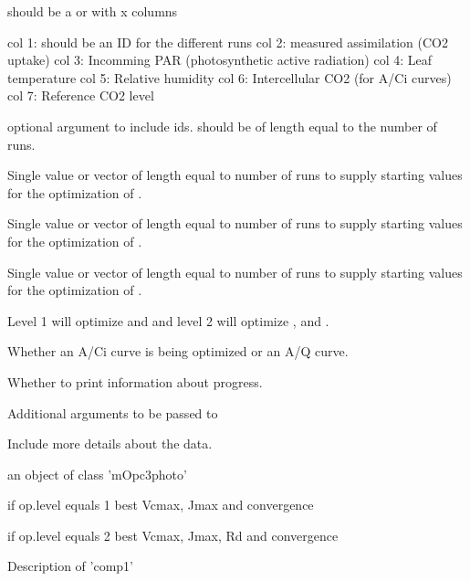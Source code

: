 \documentclass[letterpaper]{book}
\begin{document}
\begin{Arguments}
\begin{ldescription}
\item[\code{data}] should be a  or
 with x columns

col 1: should be an ID for the different runs col 2:
measured assimilation (CO2 uptake) col 3: Incomming PAR
(photosynthetic active radiation) col 4: Leaf temperature
col 5: Relative humidity col 6: Intercellular CO2 (for
A/Ci curves) col 7: Reference CO2 level

\item[\code{ID}] optional argument to include ids. should be of
length equal to the number of runs.

\item[\code{iVcmax}] Single value or vector of length equal to
number of runs to supply starting values for the
optimization of .

\item[\code{iJmax}] Single value or vector of length equal to
number of runs to supply starting values for the
optimization of .

\item[\code{iRd}] Single value or vector of length equal to
number of runs to supply starting values for the
optimization of .

\item[\code{op.level}] Level 1 will optimize  and
 and level 2 will optimize ,
 and .

\item[\code{curve.kind}] Whether an A/Ci curve is being
optimized or an A/Q curve.

\item[\code{verbose}] Whether to print information about
progress.

\item[\code{...}] Additional arguments to be passed to
\end{ldescription}
\end{Arguments}
%
\begin{Details}\relax
Include more details about the data.
\end{Details}
%
\begin{Value}
an object of class 'mOpc3photo'

if op.level equals 1 best Vcmax, Jmax and convergence

if op.level equals 2 best Vcmax, Jmax, Rd and convergence

\begin{ldescription}
\item[\code{comp1 }] Description of 'comp1'\end{ldescription}

\end{Value}
\end{document}
